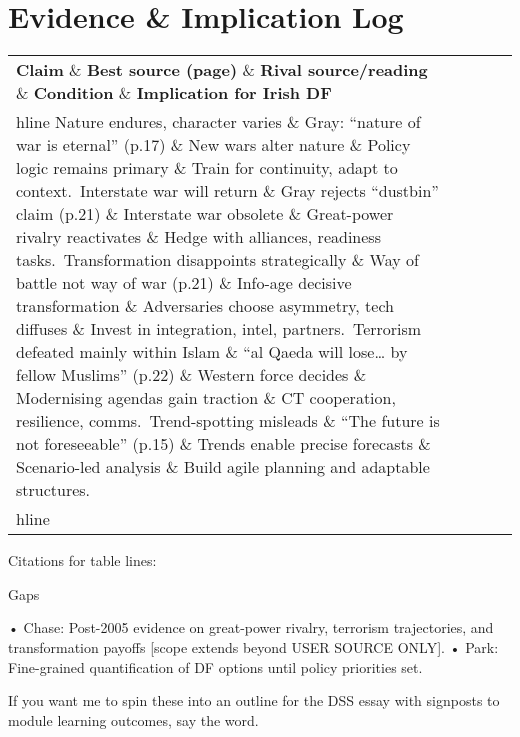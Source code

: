 \section*{Evidence \& Implication Log}
\begin{tabular}{p{3.2cm}p{4.2cm}p{3.6cm}p{3.2cm}p{4.2cm}}
	\textbf{Claim} \& \textbf{Best source (page)} \& \textbf{Rival source/reading} \& \textbf{Condition} \& \textbf{Implication for Irish DF}\\hline
	Nature endures, character varies \& Gray: “nature of war is eternal” (p.17) \& New wars alter nature \& Policy logic remains primary \& Train for continuity, adapt to context.\
	Interstate war will return \& Gray rejects “dustbin” claim (p.21) \& Interstate war obsolete \& Great-power rivalry reactivates \& Hedge with alliances, readiness tasks.\
	Transformation disappoints strategically \& Way of battle not way of war (p.21) \& Info-age decisive transformation \& Adversaries choose asymmetry, tech diffuses \& Invest in integration, intel, partners.\
	Terrorism defeated mainly within Islam \& “al Qaeda will lose… by fellow Muslims” (p.22) \& Western force decides \& Modernising agendas gain traction \& CT cooperation, resilience, comms.\
	Trend-spotting misleads \& “The future is not foreseeable” (p.15) \& Trends enable precise forecasts \& Scenario-led analysis \& Build agile planning and adaptable structures.\\hline
\end{tabular}

Citations for table lines:

Gaps

• Chase: Post-2005 evidence on great-power rivalry, terrorism trajectories, and transformation payoffs [scope extends beyond USER SOURCE ONLY].
• Park: Fine-grained quantification of DF options until policy priorities set.

If you want me to spin these into an outline for the DSS essay with signposts to module learning outcomes, say the word.

\parencite{EU_2018}

